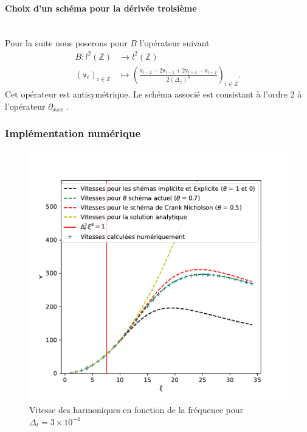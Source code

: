 \documentclass[12pt,a4paper]{article}
\numberwithin{equation}{section}
\begin{document}
\paragraph{Choix d'un schéma pour la dérivée troisième}\,\\

Pour la suite nous poserons pour $B$ l'opérateur suivant
\begin{align*}
        B : l^2(\mathbb{Z}) &\longrightarrow l^2(\mathbb{Z})\\
        (\texttt{v}_i)_{i\in\mathbb{Z}} &\mapsto \left(\frac{\texttt{v}_{i-2} - 2\texttt{v}_{i-1} + 2\texttt{v}_{i+1}-\texttt{v}_{i+2} }{2(\Delta_x)^3}\right)_{i\in\mathbb{Z}}.
\end{align*}
Cet opérateur est antisymétrique. Le schéma associé est consistant à l'ordre 2 à l'opérateur $ \partial_{xxx}$ .

\subsubsection{Implémentation numérique}

\begin{figure}[H]
    \centering
    \includegraphics[scale = 0.8]{graphs/v_xi en fonction de dt.pdf}
    \caption{Vitesse des harmoniques en fonction de la fréquence pour $\Delta_t = 3\times10^{-4}$}
    \label{fig:enter-label}
\end{figure}
\end{document}

